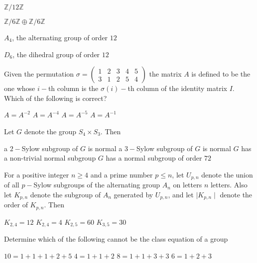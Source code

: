 \documentclass[10pt]{exam}
\begin{document}
\begin{questions}
\begin{checkboxes}
\item $\mathbb{Z}/12\mathbb{Z}$
\item $\mathbb{Z}/6\mathbb{Z} \oplus \mathbb{Z}/6\mathbb{Z}$
\item $A_4$, the alternating group of order $12$ 
\item $D_6$, the dihedral group of order $12$ 
\end{checkboxes}

\question 
Given the permutation $\sigma = \begin{pmatrix} 1 & 2 & 3 & 4 & 5 \\ 3 & 1 & 2 & 5 & 4 \end{pmatrix}$ the matrix $A$ is defined to be the one whose $i-$th column is the $\sigma(i)-$th column of the identity matrix $I$. Which of the following is correct?

\begin{oneparchoices}
\choice $A = A^{-2}$
\choice $A = A^{-4}$
\choice $A = A^{-5}$
\choice $A = A^{-1}$
\end{oneparchoices}

\question
Let $G$ denote the group $S_4 \times S_3$. Then

\begin{checkboxes}
\choice a $2-$Sylow subgroup of $G$ is normal
\choice a $3-$Sylow subgroup of $G$ is normal
\choice $G$ has a non-trivial normal subgroup
\choice $G$ has a normal subgroup of order $72$
\end{checkboxes}

 
\question
For a positive integer $n \geq 4$ and a prime number $p \leq n$, let $U_{p,n}$ denote the union of all $p-$Sylow subgroups of the alternating group $A_n$ on letters $n$ letters. Also let $K_{p,n}$ denote the subgroup of $A_n$ generated by $U_{p,n}$, and let $\mid K_{p,n} \mid$ denote the order of $K_{p,n}$. Then

\begin{oneparcheckboxes}
\choice $K_{2,4}=12$
\choice $K_{2,4}=4$
\choice $K_{2,5}=60$
\choice $K_{3,5}=30$  
\end{oneparcheckboxes}

\question
Determine which of the following cannot be the class equation of a group

\begin{oneparcheckboxes}
\choice $10=1+1+1+2+5$
\choice $4=1+1+2$
\choice $8=1+1+3+3$
\choice $6=1+2+3$
\end{oneparcheckboxes}


\end{questions}
\end{document}
